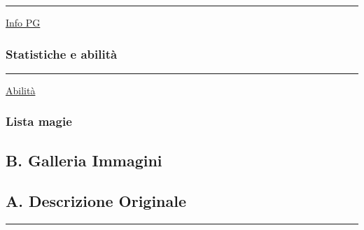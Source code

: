 \begin{center}\rule{0.5\linewidth}{0.5pt}\end{center}

\href{Info\%20PG\%203f8f648f857f45638404a4002935f782.csv}{Info PG}

\subsubsection{Statistiche e abilità}\label{statistiche-e-abilituxe0}

\begin{center}\rule{0.5\linewidth}{0.5pt}\end{center}

\href{Abilita\%CC\%80\%2030656d6a803f4118859cebbb4b9a8b94.csv}{Abilità}

\subsubsection{Lista magie}\label{lista-magie}

\subsection{B. Galleria Immagini}\label{b.-galleria-immagini}

\subsection{A. Descrizione Originale}\label{a.-descrizione-originale}

\begin{center}\rule{0.5\linewidth}{0.5pt}\end{center}

